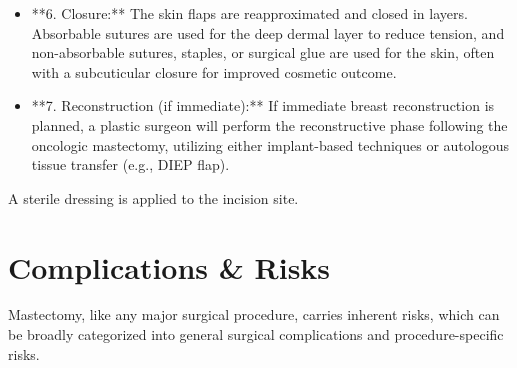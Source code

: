 \begin{itemize}
  \item **6. Closure:** The skin flaps are reapproximated and closed in layers. Absorbable sutures are used for the deep dermal layer to reduce tension, and non-absorbable sutures, staples, or surgical glue are used for the skin, often with a subcuticular closure for improved cosmetic outcome.
  \item **7. Reconstruction (if immediate):** If immediate breast reconstruction is planned, a plastic surgeon will perform the reconstructive phase following the oncologic mastectomy, utilizing either implant-based techniques or autologous tissue transfer (e.g., DIEP flap).
\end{itemize}

A sterile dressing is applied to the incision site.

\section*{Complications \& Risks}
Mastectomy, like any major surgical procedure, carries inherent risks, which can be broadly categorized into general surgical complications and procedure-specific risks.

